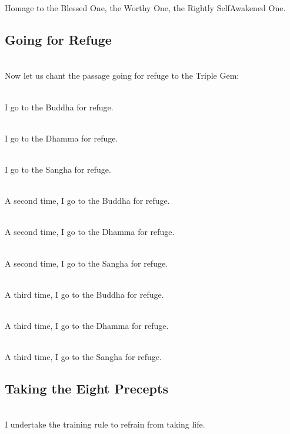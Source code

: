 \documentclass[letterpaper,10pt,english]{sphinxmanual}
\begin{document}
\sphinxAtStartPar
Homage to the Blessed One, the Worthy One, the Rightly Self\sphinxhyphen{}Awakened One.


\subsection{Going for Refuge}
\label{\detokenize{chanting:going-for-refuge}}
\sphinxAtStartPar
{}  \\
Now let us chant the passage going for refuge to the Triple Gem:

\sphinxAtStartPar
{} \\
I go to the Buddha for refuge.

\sphinxAtStartPar
{} \\
I go to the Dhamma for refuge.

\sphinxAtStartPar
{} \\
I go to the Sangha for refuge.

\sphinxAtStartPar
{} \\
A second time, I go to the Buddha for refuge.

\sphinxAtStartPar
{} \\
A second time, I go to the Dhamma for refuge.

\sphinxAtStartPar
{} \\
A second time, I go to the Sangha for refuge.

\sphinxAtStartPar
{} \\
A third time, I go to the Buddha for refuge.

\sphinxAtStartPar
{} \\
A third time, I go to the Dhamma for refuge.

\sphinxAtStartPar
{} \\
A third time, I go to the Sangha for refuge.


\subsection{Taking the Eight Precepts}
\label{\detokenize{chanting:taking-the-eight-precepts}}
\sphinxAtStartPar
{}  \\
I undertake the training rule to refrain from taking life.
\end{document}

